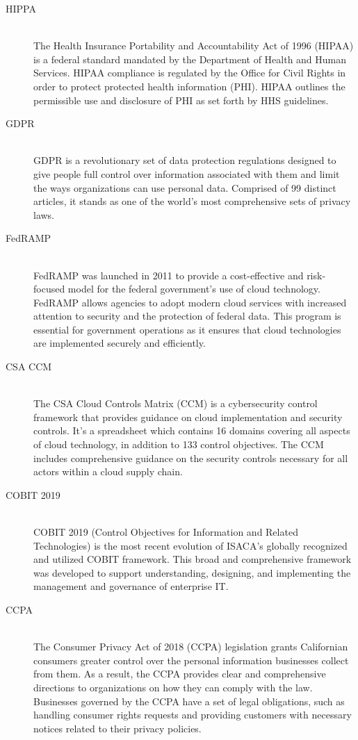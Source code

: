 \begin{description}
     \item[HIPPA] \hfill \\
          The Health Insurance Portability and Accountability Act of 1996 (HIPAA) is a federal standard mandated by the Department of Health and Human Services. HIPAA compliance is regulated by the Office for Civil Rights in order to protect protected health information (PHI). HIPAA outlines the permissible use and disclosure of PHI as set forth by HHS guidelines.
     \item[GDPR] \hfill \\
          GDPR is a revolutionary set of data protection regulations designed to give people full control over information associated with them and limit the ways organizations can use personal data. Comprised of 99 distinct articles, it stands as one of the world's most comprehensive sets of privacy laws.
     \item[FedRAMP] \hfill \\
          FedRAMP\textsuperscript{\textregistered} was launched in 2011 to provide a cost-effective and risk-focused model for the federal government's use of cloud technology. FedRAMP allows agencies to adopt modern cloud services with increased attention to security and the protection of federal data. This program is essential for government operations as it ensures that cloud technologies are implemented securely and efficiently.
     \item[CSA CCM] \hfill \\
          The CSA Cloud Controls Matrix (CCM) is a cybersecurity control framework that provides guidance on cloud implementation and security controls. It's a spreadsheet which contains 16 domains covering all aspects of cloud technology, in addition to 133 control objectives. The CCM includes comprehensive guidance on the security controls necessary for all actors within a cloud supply chain.
     \item[COBIT 2019] \hfill \\
          COBIT\textsuperscript{\textregistered} 2019 (Control Objectives for Information and Related Technologies) is the most recent evolution of ISACA’s globally recognized and utilized COBIT framework. This broad and comprehensive framework was developed to support understanding, designing, and implementing the management and governance of enterprise IT.
     \item[CCPA] \hfill \\
          The Consumer Privacy Act of 2018 (CCPA) legislation grants Californian consumers greater control over the personal information businesses collect from them. As a result, the CCPA provides clear and comprehensive directions to organizations on how they can comply with the law. Businesses governed by the CCPA have a set of legal obligations, such as handling consumer rights requests and providing customers with necessary notices related to their privacy policies.

\end{description}
